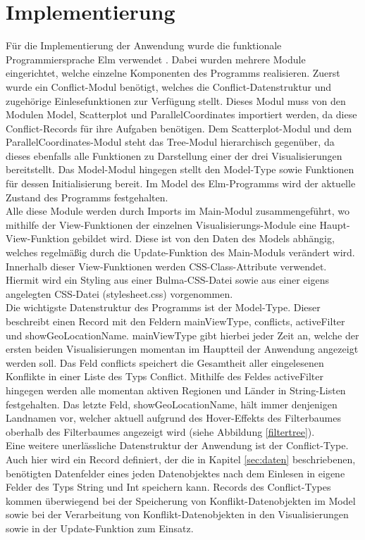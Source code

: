 \documentclass[usegeometry=true]{scrartcl}
\begin{document}
\section{Implementierung}
Für die Implementierung der Anwendung wurde die funktionale Programmiersprache Elm verwendet \cite{elm}. Dabei wurden mehrere Module eingerichtet, welche einzelne Komponenten des Programms realisieren. Zuerst wurde ein Conflict-Modul benötigt, welches die Conflict-Datenstruktur und zugehörige Einlesefunktionen zur Verfügung stellt. Dieses Modul muss von den Modulen Model, Scatterplot und ParallelCoordinates importiert werden, da diese Conflict-Records für ihre Aufgaben benötigen. Dem Scatterplot-Modul und dem ParallelCoordinates-Modul steht das Tree-Modul hierarchisch gegenüber, da dieses ebenfalls alle Funktionen zu Darstellung einer der drei Visualisierungen bereitstellt. Das Model-Modul hingegen stellt den Model-Type sowie Funktionen für dessen Initialisierung bereit. Im Model des Elm-Programms wird der aktuelle Zustand des Programms festgehalten.\\ Alle diese Module werden durch Imports im Main-Modul zusammengeführt, wo mithilfe der View-Funktionen der einzelnen Visualisierungs-Module eine Haupt-View-Funktion gebildet wird. Diese ist von den Daten des Models abhängig, welches regelmäßig durch die Update-Funktion des Main-Moduls verändert wird. Innerhalb dieser View-Funktionen werden CSS-Class-Attribute verwendet. Hiermit wird ein Styling aus einer Bulma-CSS-Datei sowie aus einer eigens angelegten CSS-Datei (\glqq stylesheet.css\grqq) vorgenommen.\\

Die wichtigste Datenstruktur des Programms ist der Model-Type. Dieser beschreibt einen Record mit den Feldern \glqq mainViewType\grqq, \glqq conflicts\grqq, \glqq activeFilter\grqq{} und \glqq showGeoLocationName\grqq. \glqq mainViewType\grqq{} gibt hierbei jeder Zeit an, welche der ersten beiden Visualisierungen momentan im Hauptteil der Anwendung angezeigt werden soll. Das Feld \glqq conflicts\grqq{} speichert die Gesamtheit aller eingelesenen Konflikte in einer Liste des Typs \glqq Conflict\grqq. Mithilfe des Feldes \glqq activeFilter\grqq{} hingegen werden alle momentan aktiven Regionen und Länder in String-Listen festgehalten. Das letzte Feld, \glqq showGeoLocationName\grqq, hält immer denjenigen Landnamen vor, welcher aktuell aufgrund des Hover-Effekts des Filterbaumes oberhalb des Filterbaumes angezeigt wird (siehe Abbildung \ref{filtertree}).\\ Eine weitere unerlässliche Datenstruktur der Anwendung ist der Conflict-Type. Auch hier wird ein Record definiert, der die in Kapitel \ref{sec:daten} beschriebenen, benötigten Datenfelder eines jeden Datenobjektes nach dem Einlesen in eigene Felder des Typs String und Int speichern kann. Records des Conflict-Types kommen überwiegend bei der Speicherung von Konflikt-Datenobjekten im Model sowie bei der Verarbeitung von Konflikt-Datenobjekten in den Visualisierungen sowie in der Update-Funktion zum Einsatz.\\
\end{document}
